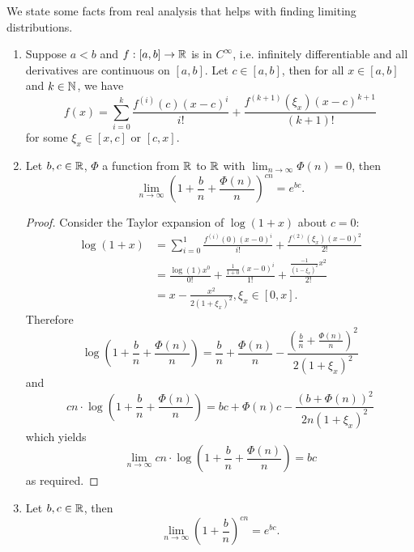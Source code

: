 \documentclass[11pt,fleqn]{book} %
\begin{document}
\begin{remark} \label{rmk:412}
We state some facts from real analysis that helps with finding limiting distributions.
\begin{enumerate}
\item Suppose \(a < b\) and \(f:[a, b]\rightarrow\mathbb{R}\) is in \(C^\infty\), i.e. infinitely differentiable and all derivatives are continuous on \([a, b]\). Let \(c \in [a, b]\), then for all \(x \in [a, b]\) and \(k \in \mathbb{N}\), we have
\[
f(x) = \sum_{i=0}^k \frac{f^{(i)}(c)(x-c)^i}{i!} + \frac{f^{(k+1)}(\xi_x)(x - c)^{k + 1}}{(k+1)!}
\]
for some \(\xi_x \in [x, c]\) or \([c, x]\).
\item Let \(b, c \in \mathbb{R}\), \(\Phi\) a function from \(\mathbb{R}\) to \(\mathbb{R}\) with \(\lim_{n\rightarrow\infty} \Phi(n) = 0\), then
\[
\lim_{n\rightarrow\infty}\left(1 + \frac{b}{n} + \frac{\Phi(n)}{n}\right)^{cn} = e^{bc}.
\]
\begin{proof}
Consider the Taylor expansion of \(\log(1 + x)\) about \(c = 0\):
\[
\begin{aligned}
\log(1+x) &= \sum_{i=0}^1 \frac{f^{(i)}(0)(x-0)^i}{i!} + \frac{f^{(2)}(\xi_x)(x-0)^2}{2!} \\
&= \frac{\log(1)x^0}{0!} + \frac{\frac{1}{1+0}(x-0)^i}{1!} + \frac{\frac{-1}{(1 - \xi_x)^2}x^2}{2!} \\
&= x - \frac{x^2}{2(1 + \xi_x)^2}, \xi_x \in [0, x].
\end{aligned}
\]
\indent Therefore
\[
\log\left(1 + \frac{b}{n} + \frac{\Phi(n)}{n}\right) = \frac{b}{n} + \frac{\Phi(n)}{n} - \frac{\left(\frac{b}{n} + \frac{\Phi(n)}{n}\right)^2}{2(1 + \xi_x)^2}
\]
and
\[
cn\cdot\log\left(1 + \frac{b}{n} + \frac{\Phi(n)}{n}\right) = bc + \Phi(n)c - \frac{(b + \Phi(n))^2}{2n(1 + \xi_x)^2}
\]
which yields
\[
\lim_{n\rightarrow\infty} cn\cdot\log\left(1 + \frac{b}{n} + \frac{\Phi(n)}{n}\right) = bc
\]
as required.
\end{proof}
\item Let \(b, c \in \mathbb{R}\), then
\[
\lim_{n\rightarrow\infty}\left(1 + \frac{b}{n}\right)^{cn} = e^{bc}.
\]
\end{enumerate}
\end{remark}
\end{document}
